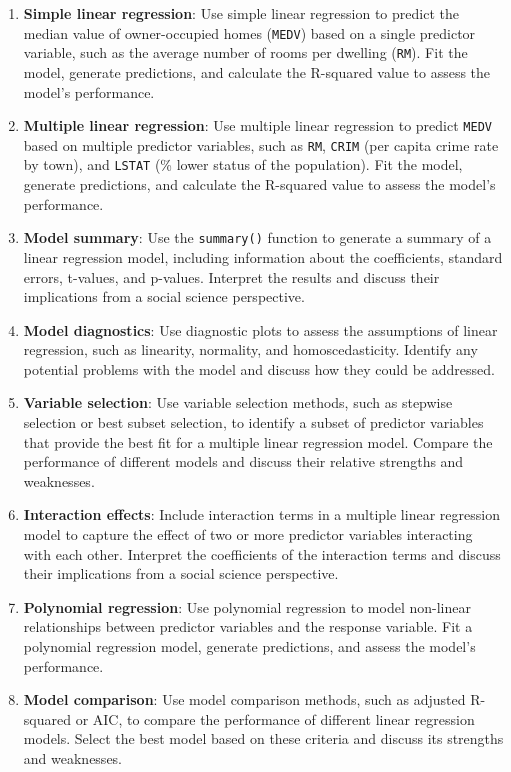 \documentclass[
]{book}
\providecommand{\tightlist}{%
  \setlength{\itemsep}{0pt}\setlength{\parskip}{0pt}}
\begin{document}
\begin{enumerate}
\def\labelenumi{\arabic{enumi}.}
\tightlist
\item
  \textbf{Simple linear regression}: Use simple linear regression to predict the median value of owner-occupied homes (\texttt{MEDV}) based on a single predictor variable, such as the average number of rooms per dwelling (\texttt{RM}). Fit the model, generate predictions, and calculate the R-squared value to assess the model's performance.
\item
  \textbf{Multiple linear regression}: Use multiple linear regression to predict \texttt{MEDV} based on multiple predictor variables, such as \texttt{RM}, \texttt{CRIM} (per capita crime rate by town), and \texttt{LSTAT} (\% lower status of the population). Fit the model, generate predictions, and calculate the R-squared value to assess the model's performance.
\item
  \textbf{Model summary}: Use the \texttt{summary()} function to generate a summary of a linear regression model, including information about the coefficients, standard errors, t-values, and p-values. Interpret the results and discuss their implications from a social science perspective.
\item
  \textbf{Model diagnostics}: Use diagnostic plots to assess the assumptions of linear regression, such as linearity, normality, and homoscedasticity. Identify any potential problems with the model and discuss how they could be addressed.
\item
  \textbf{Variable selection}: Use variable selection methods, such as stepwise selection or best subset selection, to identify a subset of predictor variables that provide the best fit for a multiple linear regression model. Compare the performance of different models and discuss their relative strengths and weaknesses.
\item
  \textbf{Interaction effects}: Include interaction terms in a multiple linear regression model to capture the effect of two or more predictor variables interacting with each other. Interpret the coefficients of the interaction terms and discuss their implications from a social science perspective.
\item
  \textbf{Polynomial regression}: Use polynomial regression to model non-linear relationships between predictor variables and the response variable. Fit a polynomial regression model, generate predictions, and assess the model's performance.
\item
  \textbf{Model comparison}: Use model comparison methods, such as adjusted R-squared or AIC, to compare the performance of different linear regression models. Select the best model based on these criteria and discuss its strengths and weaknesses.

\end{enumerate}
\end{document}

